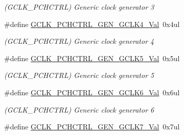 \begin{DoxyCompactItemize}
\begin{DoxyCompactList}\small\item\em (G\+C\+L\+K\+\_\+\+P\+C\+H\+C\+T\+R\+L) Generic clock generator 3 \end{DoxyCompactList}\item 
\hypertarget{group___s_a_m_l21___g_c_l_k_gaced1a57c09e580b2f53d95b87fda8da1}{}\#define \hyperlink{group___s_a_m_l21___g_c_l_k_gaced1a57c09e580b2f53d95b87fda8da1}{G\+C\+L\+K\+\_\+\+P\+C\+H\+C\+T\+R\+L\+\_\+\+G\+E\+N\+\_\+\+G\+C\+L\+K4\+\_\+\+Val}~0x4ul\label{group___s_a_m_l21___g_c_l_k_gaced1a57c09e580b2f53d95b87fda8da1}

\begin{DoxyCompactList}\small\item\em (G\+C\+L\+K\+\_\+\+P\+C\+H\+C\+T\+R\+L) Generic clock generator 4 \end{DoxyCompactList}\item 
\hypertarget{group___s_a_m_l21___g_c_l_k_ga24712f106984f02229f430f6937212c0}{}\#define \hyperlink{group___s_a_m_l21___g_c_l_k_ga24712f106984f02229f430f6937212c0}{G\+C\+L\+K\+\_\+\+P\+C\+H\+C\+T\+R\+L\+\_\+\+G\+E\+N\+\_\+\+G\+C\+L\+K5\+\_\+\+Val}~0x5ul\label{group___s_a_m_l21___g_c_l_k_ga24712f106984f02229f430f6937212c0}

\begin{DoxyCompactList}\small\item\em (G\+C\+L\+K\+\_\+\+P\+C\+H\+C\+T\+R\+L) Generic clock generator 5 \end{DoxyCompactList}\item 
\hypertarget{group___s_a_m_l21___g_c_l_k_gae698cff036e8050049f6cb94ef9a0ad0}{}\#define \hyperlink{group___s_a_m_l21___g_c_l_k_gae698cff036e8050049f6cb94ef9a0ad0}{G\+C\+L\+K\+\_\+\+P\+C\+H\+C\+T\+R\+L\+\_\+\+G\+E\+N\+\_\+\+G\+C\+L\+K6\+\_\+\+Val}~0x6ul\label{group___s_a_m_l21___g_c_l_k_gae698cff036e8050049f6cb94ef9a0ad0}

\begin{DoxyCompactList}\small\item\em (G\+C\+L\+K\+\_\+\+P\+C\+H\+C\+T\+R\+L) Generic clock generator 6 \end{DoxyCompactList}\item 
\hypertarget{group___s_a_m_l21___g_c_l_k_gae2a70517fe25b2bc24f79e84c2c160b0}{}\#define \hyperlink{group___s_a_m_l21___g_c_l_k_gae2a70517fe25b2bc24f79e84c2c160b0}{G\+C\+L\+K\+\_\+\+P\+C\+H\+C\+T\+R\+L\+\_\+\+G\+E\+N\+\_\+\+G\+C\+L\+K7\+\_\+\+Val}~0x7ul\label{group___s_a_m_l21___g_c_l_k_gae2a70517fe25b2bc24f79e84c2c160b0}


\end{DoxyCompactItemize}
